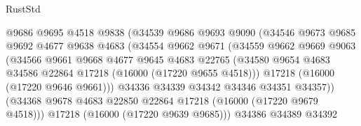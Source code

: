 \begin{lexlean}{RustStd}
\begin{coremodule}
                                @9686
                                @9695
                                @4518
                                @9838
                                (@34539
                                  @9686
                                  @9693
                                  @9090
                                  (@34546
                                    @9673
                                    @9685
                                    @9692
                                    @4677
                                    @9638
                                    @4683
                                    (@34554
                                      @9662
                                      @9671
                                      (@34559
                                        @9662
                                        @9669
                                        @9063
                                        (@34566
                                          @9661
                                          @9668
                                          @4677
                                          @9645
                                          @4683
                                          @22765
                                          (@34580
                                            @9654
                                            @4683
                                            @34586
                                            @22864
                                            @17218
                                            (@16000 (@17220 @9655 @4518)))
                                          @17218
                                          (@16000 (@17220 @9646 @9661)))
                                        @34336
                                        @34339
                                        @34342
                                        @34346
                                        @34351
                                        @34357))
                                    (@34368
                                      @9678
                                      @4683
                                      @22850
                                      @22864
                                      @17218
                                      (@16000 (@17220 @9679 @4518)))
                                    @17218
                                    (@16000 (@17220 @9639 @9685)))
                                  @34386
                                  @34389
                                  @34392

\end{coremodule}
\end{lexlean}
